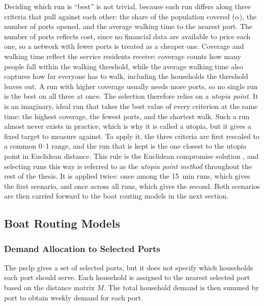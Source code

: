 \documentclass[12pt]{article}
\begin{document}
Deciding which run is ``best'' is not trivial, because each run differs along three criteria that pull against each other: the share of the population covered (\(\alpha\)), the number of ports opened, and the average walking time to the nearest port. The number of ports reflects cost, since no financial data are available to price each one, so a network with fewer ports is treated as a cheaper one. Coverage and walking time reflect the service residents receive: coverage counts how many people fall within the walking threshold, while the average walking time also captures how far everyone has to walk, including the households the threshold leaves out. A run with higher coverage usually needs more ports, so no single run is the best on all three at once. The selection therefore relies on a \textit{utopia point}. It is an imaginary, ideal run that takes the best value of every criterion at the same time: the highest coverage, the fewest ports, and the shortest walk. Such a run almost never exists in practice, which is why it is called a utopia, but it gives a fixed target to measure against. To apply it, the three criteria are first rescaled to a common 0--1 range, and the run that is kept is the one closest to the utopia point in Euclidean distance. This rule is the Euclidean compromise solution \parencite{voorneveld2011euclidean}, and selecting runs this way is referred to as the \textit{utopia point method} throughout the rest of the thesis. It is applied twice: once among the \qty{15}{\minute} runs, which gives the first scenario, and once across all runs, which gives the second. Both scenarios are then carried forward to the boat routing models in the next section.

\subsection{Boat Routing Models}
\label{subsec:boat-routing-models}

\subsubsection{Demand Allocation to Selected Ports}
\label{subsubsec:demand-allocation-to-selected-ports}

The \ac{psclp} gives a set of selected ports, but it does not specify which households each port should serve. Each household is assigned to the nearest selected port based on the distance matrix \(M\). The total household demand is then summed by port to obtain weekly demand for each port.
\end{document}
